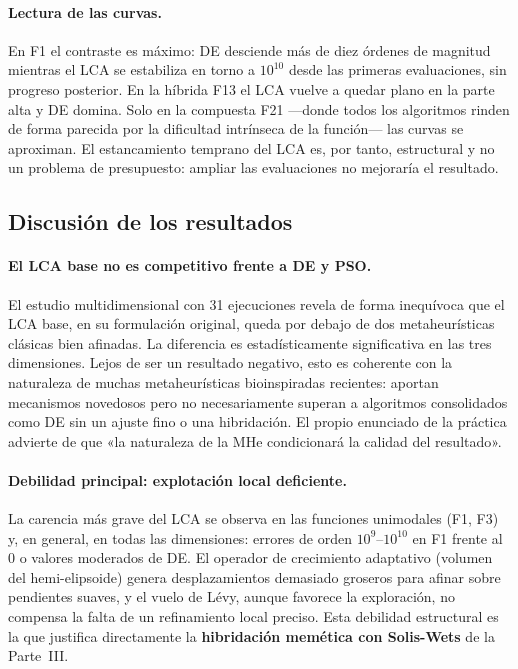 \paragraph{Lectura de las curvas.}
En F1 el contraste es máximo: DE desciende más de diez órdenes de magnitud mientras el LCA se
estabiliza en torno a $10^{10}$ desde las primeras evaluaciones, sin progreso posterior. En la
híbrida F13 el LCA vuelve a quedar plano en la parte alta y DE domina. Solo en la compuesta
F21 ---donde todos los algoritmos rinden de forma parecida por la dificultad intrínseca de la
función--- las curvas se aproximan. El estancamiento temprano del LCA es, por tanto,
estructural y no un problema de presupuesto: ampliar las evaluaciones no mejoraría el
resultado.

\subsection{Discusión de los resultados}

\paragraph{El LCA base no es competitivo frente a DE y PSO.}
El estudio multidimensional con 31 ejecuciones revela de forma inequívoca que el LCA base,
en su formulación original, queda por debajo de dos metaheurísticas clásicas bien
afinadas. La diferencia es estadísticamente significativa en las tres dimensiones. Lejos de
ser un resultado negativo, esto es coherente con la naturaleza de muchas metaheurísticas
bioinspiradas recientes: aportan mecanismos novedosos pero no necesariamente superan a
algoritmos consolidados como DE sin un ajuste fino o una hibridación. El propio enunciado de
la práctica advierte de que «la naturaleza de la MHe condicionará la calidad del resultado».

\paragraph{Debilidad principal: explotación local deficiente.}
La carencia más grave del LCA se observa en las funciones unimodales (F1, F3) y, en general,
en todas las dimensiones: errores de orden $10^{9}$--$10^{10}$ en F1 frente al $0$ o valores
moderados de DE. El operador de crecimiento adaptativo (volumen del hemi-elipsoide) genera
desplazamientos demasiado groseros para afinar sobre pendientes suaves, y el vuelo de Lévy,
aunque favorece la exploración, no compensa la falta de un refinamiento local preciso. Esta
debilidad estructural es la que justifica directamente la \textbf{hibridación memética con
Solis-Wets} de la Parte~III.

